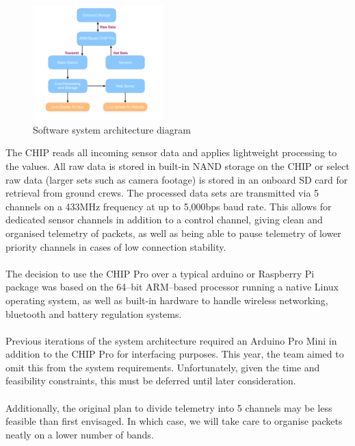 \documentclass{report}
\begin{document}
		\begin{figure}
			\vspace{-30pt}
	 		\begin{center}
			\includegraphics[width=0.45\textwidth]{software}
			\end{center}
			\vspace{-15pt}
			\caption[X]{Software system architecture diagram}
		\end{figure}

		The CHIP reads all incoming sensor data and applies lightweight processing
		to the values. All raw data is stored in built-in NAND storage on the CHIP
		or select raw data (larger sets such as camera footage) is stored in an
		onboard SD card for retrieval from ground crews. The processed data sets 
		are transmitted via 5 channels on a 433MHz frequency at up to 5,000bps
		baud rate. This allows for dedicated sensor channels in addition to a control
		channel, giving clean and organised telemetry of packets, as well as being
		able to pause telemetry of lower priority channels in cases of low 
		connection stability.
		\\\\
		The decision to use the CHIP Pro over a typical arduino or Raspberry Pi
		package was based on the 64--bit ARM--based processor running a 
		native Linux operating system, as well as built-in hardware to handle 
		wireless networking, bluetooth and battery regulation systems.
		\\\\
		{\color{blue}Previous iterations of the system architecture required 
		an Arduino Pro Mini in addition to the CHIP Pro for interfacing purposes.
		This year, the team aimed to omit this from the system requirements.
		Unfortunately, given the time and feasibility constraints, this must be deferred
		until later consideration.
		\\\\
		Additionally, the original plan to divide telemetry into
		5 channels may be less feasible than first envisaged. In which case, we will 
		take care to organise packets neatly on a lower number of bands.
		}
\end{document}
